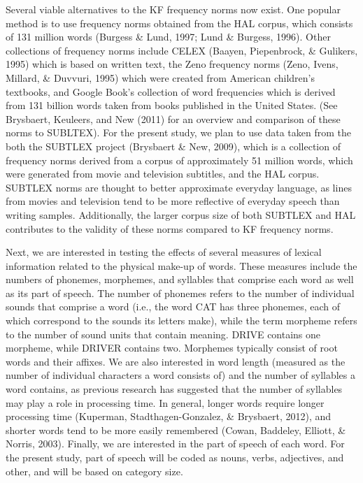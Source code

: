 \documentclass[english,man]{apa6}
\theoremstyle{definition}
\theoremstyle{definition}
\theoremstyle{definition}
\theoremstyle{remark}
\begin{document}
Several viable alternatives to the KF frequency norms now exist. One
popular method is to use frequency norms obtained from the HAL corpus,
which consists of 131 million words (Burgess \& Lund, 1997; Lund \&
Burgess, 1996). Other collections of frequency norms include CELEX
(Baayen, Piepenbrock, \& Gulikers, 1995) which is based on written text,
the Zeno frequency norms (Zeno, Ivens, Millard, \& Duvvuri, 1995) which
were created from American children's textbooks, and Google Book's
collection of word frequencies which is derived from 131 billion words
taken from books published in the United States. (See Brysbaert,
Keuleers, and New (2011) for an overview and comparison of these norms
to SUBLTEX). For the present study, we plan to use data taken from the
both the SUBTLEX project (Brysbaert \& New, 2009), which is a collection
of frequency norms derived from a corpus of approximately 51 million
words, which were generated from movie and television subtitles, and the
HAL corpus. SUBTLEX norms are thought to better approximate everyday
language, as lines from movies and television tend to be more reflective
of everyday speech than writing samples. Additionally, the larger corpus
size of both SUBTLEX and HAL contributes to the validity of these norms
compared to KF frequency norms.

Next, we are interested in testing the effects of several measures of
lexical information related to the physical make-up of words. These
measures include the numbers of phonemes, morphemes, and syllables that
comprise each word as well as its part of speech. The number of phonemes
refers to the number of individual sounds that comprise a word (i.e.,
the word CAT has three phonemes, each of which correspond to the sounds
its letters make), while the term morpheme refers to the number of sound
units that contain meaning. DRIVE contains one morpheme, while DRIVER
contains two. Morphemes typically consist of root words and their
affixes. We are also interested in word length (measured as the number
of individual characters a word consists of) and the number of syllables
a word contains, as previous research has suggested that the number of
syllables may play a role in processing time. In general, longer words
require longer processing time (Kuperman, Stadthagen-Gonzalez, \&
Brysbaert, 2012), and shorter words tend to be more easily remembered
(Cowan, Baddeley, Elliott, \& Norris, 2003). Finally, we are interested
in the part of speech of each word. For the present study, part of
speech will be coded as nouns, verbs, adjectives, and other, and will be
based on category size.
\end{document}
